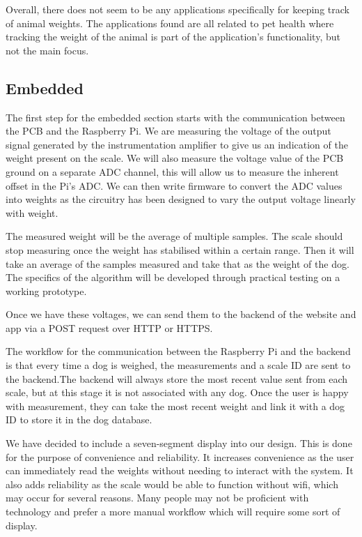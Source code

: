 Overall, there does not seem to be any applications specifically for keeping track of animal weights. The applications found are all related to pet health where tracking the weight of the animal is part of the application’s functionality, but not the main focus.


\subsection{Embedded}
The first step for the embedded section starts with the communication between the PCB and the Raspberry Pi. We are measuring the voltage of the output signal generated by the instrumentation amplifier to give us an indication of the weight present on the scale. We will also measure the voltage value of the PCB ground on a separate ADC channel, this will allow us to measure the inherent offset in the Pi’s ADC. We can then write firmware to convert the ADC values into weights as the circuitry has been designed to vary the output voltage linearly with weight. 

The measured weight will be the average of multiple samples. The scale should stop measuring once the weight has stabilised within a certain range. Then it will take an average of the samples measured and take that as the weight of the dog. The specifics of the algorithm will be developed through practical testing on a working prototype. 

Once we have these voltages, we can send them to the backend of the website and app via a POST request over HTTP or HTTPS. 

The workflow for the communication between the Raspberry Pi and the backend is that every time a dog is weighed, the measurements and a scale ID are sent to the backend.The backend will always store the most recent value sent from each scale, but at this stage it is not associated with any dog. Once the user is happy with measurement, they can take the most recent weight and link it with a dog ID to store it in the dog database.

We have decided to include a seven-segment display into our design. This is done for the purpose of convenience and reliability. It increases convenience as the user can immediately read the weights without needing to interact with the system. It also adds reliability as the scale would be able to function without wifi, which may occur for several reasons. Many people may not be proficient with technology and prefer a more manual workflow which will require some sort of display. 


